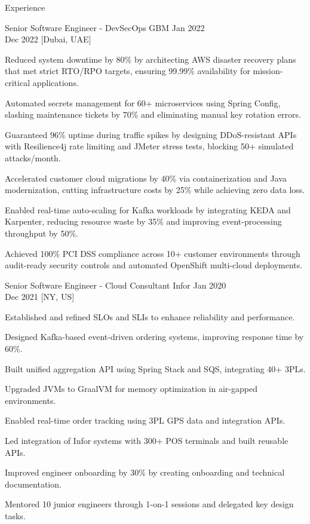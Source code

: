 \begin{rSection}{Experience}
    \begin{rSubsection}
        {Senior Software Engineer - DevSecOps}
        {GBM}
        {Jan 2022 \\ Dec 2022}
        [Dubai, UAE]
        \begin{rItemize}
            \item Reduced system downtime by 80\% by architecting AWS disaster recovery plans that met strict RTO/RPO targets, ensuring 99.99\% availability for mission-critical applications.
            \item Automated secrets management for 60+ microservices using Spring Config, slashing maintenance tickets by 70\% and eliminating manual key rotation errors.
            \item Guaranteed 96\% uptime during traffic spikes by designing DDoS-resistant APIs with Resilience4j rate limiting and JMeter stress tests, blocking 50+ simulated attacks/month.
            \item Accelerated customer cloud migrations by 40\% via containerization and Java modernization, cutting infrastructure costs by 25\% while achieving zero data loss.
            \item Enabled real-time auto-scaling for Kafka workloads by integrating KEDA and Karpenter, reducing resource waste by 35\% and improving event-processing throughput by 50\%.
            \item Achieved 100\% PCI DSS compliance across 10+ customer environments through audit-ready security controls and automated OpenShift multi-cloud deployments.
        \end{rItemize}
    \end{rSubsection}

    \begin{rSubsection}
        {Senior Software Engineer - Cloud Consultant}
        {Infor}
        {Jan 2020 \\ Dec 2021}
        [NY, US]
        \begin{rItemize}
            \item Established and refined SLOs and SLIs to enhance reliability and performance.
            \item Designed Kafka-based event-driven ordering systems, improving response time by 60\%.
            \item Built unified aggregation API using Spring Stack and SQS, integrating 40+ 3PLs.
            \item Upgraded JVMs to GraalVM for memory optimization in air-gapped environments.
            \item Enabled real-time order tracking using 3PL GPS data and integration APIs.
            \item Led integration of Infor systems with 300+ POS terminals and built reusable APIs.
            \item Improved engineer onboarding by 30\% by creating onboarding and technical documentation.
            \item Mentored 10 junior engineers through 1-on-1 sessions and delegated key design tasks.
        \end{rItemize}
    \end{rSubsection}


\end{rSection}
